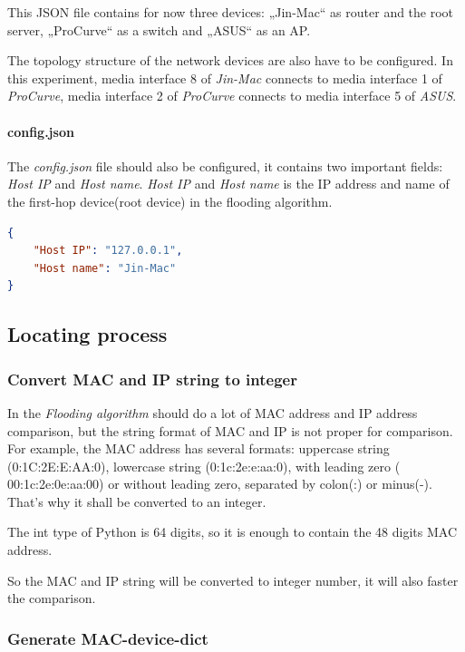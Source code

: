 This JSON file contains for now three devices: „Jin-Mac“ as router and the root server, „ProCurve“ as a switch and „ASUS“ as an AP.

The topology structure of the network devices are also have to be configured.
In this experiment, media interface 8 of \textit{Jin-Mac} connects to media interface 1 of \textit{ProCurve}, media interface 2 of \textit{ProCurve} connects to media interface 5 of \textit{ASUS}.

\paragraph{config.json}

The \textit{config.json} file should also be configured, it contains two important fields: \textit{Host IP} and \textit{Host name}. \textit{Host IP} and \textit{Host name} is the IP address and name of the first-hop device(root device) in the flooding algorithm.

\begin{lstlisting}[language=json,firstnumber=1,caption={Code sample of \textit{config.json}}]
{
	"Host IP": "127.0.0.1",
	"Host name": "Jin-Mac"
}
\end{lstlisting}

\subsection{Locating process}

\subsubsection{Convert MAC and IP string to integer}

In the \textit{Flooding algorithm} should do a lot of MAC address and IP address comparison, but the string format of MAC and IP is not proper for comparison. For example, the MAC address has several formats: uppercase string (0:1C:2E:E:AA:0), lowercase string (0:1c:2e:e:aa:0), with leading zero ( 00:1c:2e:0e:aa:00) or without leading zero, separated by colon(:) or minus(-). That's why it shall be converted to an integer.

The int type of Python is 64 digits, so it is enough to contain the 48 digits MAC address.

So the MAC and IP string will be converted to integer number, it will also faster the comparison.

\subsubsection{Generate MAC-device-dict}

